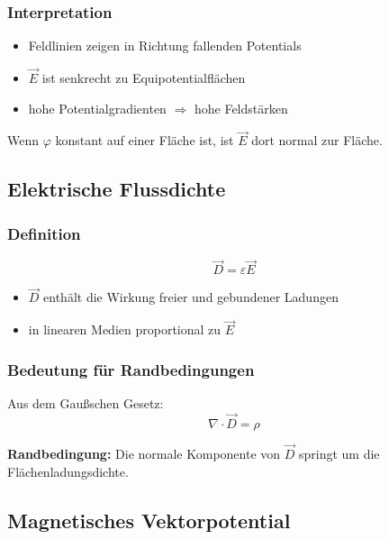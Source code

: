 \documentclass[a4paper]{article}
\newcommand{\imp}[1]{{\color{accent}\bfseries #1}}
\newcommand{\E}{\vec E}
\newcommand{\D}{\vec D}
\newcommand{\eps}{\varepsilon}
\begin{document}
\subsubsection{Interpretation}

\begin{itemize}
  \item Feldlinien zeigen in Richtung fallenden Potentials
  \item $\E$ ist senkrecht zu Equipotentialflächen
  \item hohe Potentialgradienten $\Rightarrow$ hohe Feldstärken
\end{itemize}

\begin{checkitem}
Wenn $\varphi$ konstant auf einer Fläche ist, ist $\E$ dort normal zur Fläche.
\end{checkitem}

\subsection{Elektrische Flussdichte}

\subsubsection{Definition}

\[
\D = \eps \E
\]

\begin{itemize}
  \item $\D$ enthält die Wirkung freier und gebundener Ladungen
  \item in linearen Medien proportional zu $\E$
\end{itemize}

\subsubsection{Bedeutung für Randbedingungen}

Aus dem Gaußschen Gesetz:
\[
\nabla \cdot \D = \rho
\]

\begin{schema}
\imp{Randbedingung:}
Die normale Komponente von $\D$ springt um die Flächenladungsdichte.
\end{schema}

\subsection{Magnetisches Vektorpotential}
\end{document}
